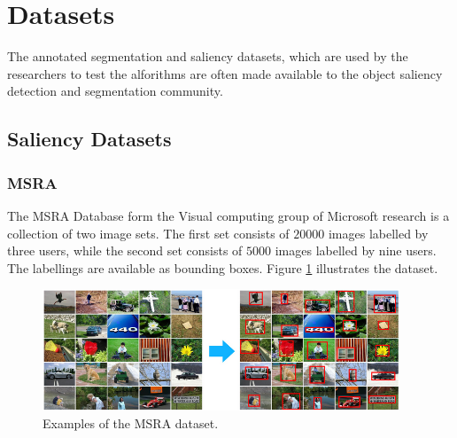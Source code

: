 \section{Datasets}
\label{sec:db}

The annotated segmentation and saliency datasets, which are used by the researchers to test the alforithms are often made available to the object saliency detection and segmentation community.

\subsection{Saliency Datasets}
\subsubsection{MSRA}
The MSRA  Database form the Visual computing group of Microsoft  research \cite{msra_db} is a collection of two image sets. The first set consists of $20 000$ images labelled by three users, while the second set consists of $5000$ images labelled by nine users. The labellings are available as bounding boxes. Figure \ref{fig:msra} illustrates the dataset.
\begin{figure}[H]
\begin{center}
\includegraphics[width=0.95\textwidth]{fig/MSRA}
\end{center}
\caption{Examples of the MSRA dataset.}
\label{fig:msra}
\end{figure}
